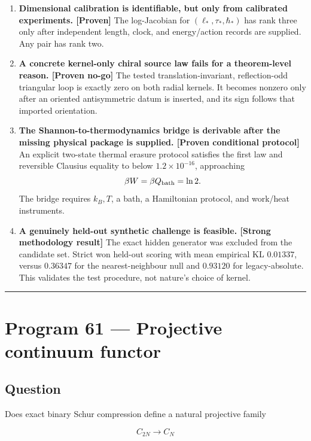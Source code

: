 \documentclass[11pt,a4paper,openany]{report}
\newcommand{\statusProven}{\textcolor{fingreen}{[Proven]}}
\begin{document}
\begin{enumerate}
\item 
\textbf{Dimensional calibration is identifiable, but only from calibrated experiments. \statusProven{}} The log-Jacobian for \((\ell_*,\tau_*,\hbar_*)\) has rank three only after independent length, clock, and energy/\allowbreak{}action records are supplied. Any pair has rank two.

\item 
\textbf{A concrete kernel-only chiral source law fails for a theorem-level reason. [Proven no-go]} The tested translation-invariant, reflection-odd triangular loop is exactly zero on both radial kernels. It becomes nonzero only after an oriented antisymmetric datum is inserted, and its sign follows that imported orientation.

\item 
\textbf{The Shannon-to-thermodynamics bridge is derivable after the missing physical package is supplied. [Proven conditional protocol]} An explicit two-state thermal erasure protocol satisfies the first law and reversible Clausius equality to below \(1.2\times10^{-16}\), approaching \[
   \beta W=\beta Q_{\rm bath}=\ln2.
   \] The bridge requires \(k_B,T\), a bath, a Hamiltonian protocol, and work/\allowbreak{}heat instruments.

\item 
\textbf{A genuinely held-out synthetic challenge is feasible. [Strong methodology result]} The exact hidden generator was excluded from the candidate set. Strict won held-out scoring with mean empirical KL \(0.01337\), versus \(0.36347\) for the nearest-neighbour null and \(0.93120\) for legacy-absolute. This validates the test procedure, not nature’s choice of kernel.

\end{enumerate}

\par\medskip\hrule\medskip

\chapter{Program 61 — Projective continuum functor}

\section{Question}

Does exact binary Schur compression define a natural projective family

\[
C_{2N}\longrightarrow C_N
\]
\end{document}

